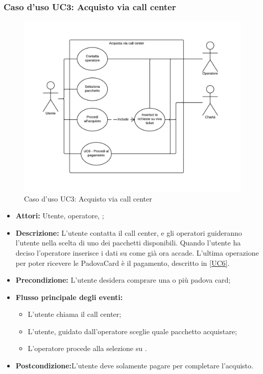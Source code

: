 \subsubsection{Caso d'uso UC3: Acquisto via call center}\label{UC3}
\begin{figure}[H]
\centering
\includegraphics[width=1\textwidth]{images/UC3.png}
\caption{Caso d'uso UC3: Acquisto via call center}
\end{figure}
\begin{itemize}
\item \textbf{Attori:} Utente, operatore, \charta;
\item \textbf{Descrizione:} L'utente contatta il call center, e gli operatori guideranno l'utente nella scelta di uno dei pacchetti disponibili. Quando l'utente ha deciso l'operatore inserisce i dati su \tlite come già ora accade. L'ultima operazione per poter ricevere le PadovaCard è il pagamento, descritto in \ref{UC6}.
\item \textbf{Precondizione:} L'utente desidera comprare una o più padova card;
\item \textbf{Flusso principale degli eventi:}
	\begin{itemize}
		\item L'utente chiama il call center;
		\item L'utente, guidato dall'operatore sceglie quale pacchetto acquistare;
        \item L'operatore procede alla selezione su \tlite.
	\end{itemize}
\item \textbf{Postcondizione:}L'utente deve solamente pagare per completare l'acquisto.
\end{itemize}

